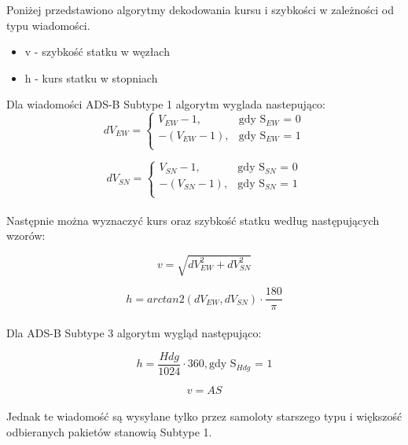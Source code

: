 \documentclass[eng,printmode]{mgr}
\begin{document}
Poniżej przedstawiono algorytmy dekodowania kursu i szybkości w zależności od typu wiadomości.
\begin{itemize}
\item v - szybkość statku w węzłach
\item h - kurs statku w stopniach
\end{itemize}

\noindent
Dla wiadomości ADS-B Subtype 1 algorytm wyglada nastepująco:
\begin{equation}
\renewcommand*{\arraystretch}{1.3}
dV_{EW}= \left\{ \begin{array}{ll}
V_{EW} - 1, & \textrm{gdy S$_{EW}$ = 0}\\
-(V_{EW} - 1), & \textrm{gdy S$_{EW}$ = 1}\\
\end{array} \right.
\end{equation}

\begin{equation}
\renewcommand*{\arraystretch}{1.3}
dV_{SN}= \left\{ \begin{array}{ll}
V_{SN} - 1, & \textrm{gdy S$_{SN}$ = 0}\\
-(V_{SN} - 1), & \textrm{gdy S$_{SN}$ = 1}\\
\end{array} \right.
\end{equation}
\\
\noindent
Następnie można wyznaczyć kurs oraz szybkość statku według następujących wzorów:

\begin{equation}
v = \sqrt{dV_{EW}^2 + dV_{SN}^2}
\end{equation}

\begin{equation}
h = arctan2(dV_{EW},dV_{SN}) \cdot \frac{180}{\pi}
\end{equation}
\\
\noindent
Dla ADS-B Subtype 3 algorytm wygląd następująco:

\begin{equation}
h = \frac{Hdg}{1024} \cdot 360, \textrm{gdy S$_{Hdg}$ = 1}
\end{equation}

\begin{equation}
v = AS
\end{equation}
\\


Jednak te wiadomość są wysyłane tylko przez samoloty starszego typu i większość odbieranych pakietów stanowią Subtype 1.
\end{document}

